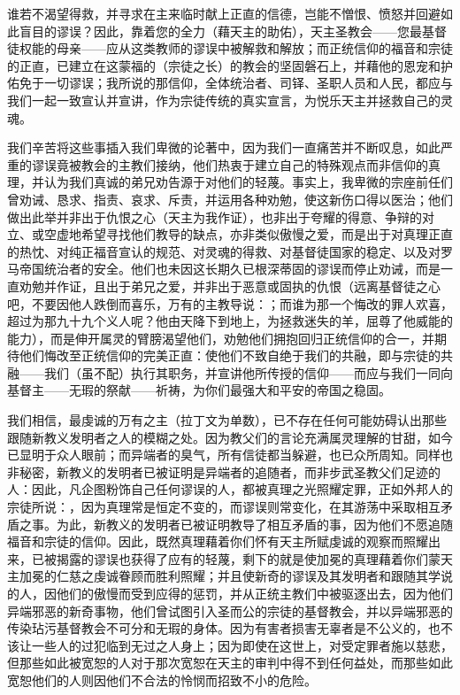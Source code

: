 谁若不渴望得救，并寻求在主来临时献上正直的信德，岂能不憎恨、愤怒并回避如此盲目的谬误？因此，靠着您的全力（藉天主的助佑），天主圣教会——您最基督徒权能的母亲——应从这类教师的谬误中被解救和解放；而正统信仰的福音和宗徒的正直，已建立在这蒙福的（宗徒之长）的教会的坚固磐石上，并藉他的恩宠和护佑免于一切谬误；我所说的那信仰，全体统治者、司铎、圣职人员和人民，都应与我们一起一致宣认并宣讲，作为宗徒传统的真实宣言，为悦乐天主并拯救自己的灵魂。\par

我们辛苦将这些事插入我们卑微的论著中，因为我们一直痛苦并不断叹息，如此严重的谬误竟被教会的主教们接纳，他们热衷于建立自己的特殊观点而非信仰的真理，并认为我们真诚的弟兄劝告源于对他们的轻蔑。事实上，我卑微的宗座前任们曾劝诫、恳求、指责、哀求、斥责，并运用各种劝勉，使这新伤口得以医治；他们做出此举并非出于仇恨之心（天主为我作证），也非出于夸耀的得意、争辩的对立、或空虚地希望寻找他们教导的缺点，亦非类似傲慢之爱，而是出于对真理正直的热忱、对纯正福音宣认的规范、对灵魂的得救、对基督徒国家的稳定、以及对罗马帝国统治者的安全。他们也未因这长期久已根深蒂固的谬误而停止劝诫，而是一直劝勉并作证，且出于弟兄之爱，并非出于恶意或固执的仇恨（远离基督徒之心吧，不要因他人跌倒而喜乐，万有的主教导说：；而谁为那一个悔改的罪人欢喜，超过为那九十九个义人呢？他由天降下到地上，为拯救迷失的羊，屈尊了他威能的能力），而是伸开属灵的臂膀渴望他们，劝勉他们拥抱回归正统信仰的合一，并期待他们悔改至正统信仰的完美正直：使他们不致自绝于我们的共融，即与宗徒的共融——我们（虽不配）执行其职务，并宣讲他所传授的信仰——而应与我们一同向基督主——无瑕的祭献——祈祷，为你们最强大和平安的帝国之稳固。\par

我们相信，最虔诚的万有之主（拉丁文为单数），已不存在任何可能妨碍认出那些跟随新教义发明者之人的模糊之处。因为教父们的言论充满属灵理解的甘甜，如今已显明于众人眼前；而异端者的臭气，所有信徒都当躲避，也已众所周知。同样也非秘密，新教义的发明者已被证明是异端者的追随者，而非步武圣教父们足迹的人：因此，凡企图粉饰自己任何谬误的人，都被真理之光照耀定罪，正如外邦人的宗徒所说：，因为真理常是恒定不变的，而谬误则常变化，在其游荡中采取相互矛盾之事。为此，新教义的发明者已被证明教导了相互矛盾的事，因为他们不愿追随福音和宗徒的信仰。因此，既然真理藉着你们怀有天主所赋虔诚的观察而照耀出来，已被揭露的谬误也获得了应有的轻蔑，剩下的就是使加冕的真理藉着你们蒙天主加冕的仁慈之虔诚眷顾而胜利照耀；并且使新奇的谬误及其发明者和跟随其学说的人，因他们的傲慢而受到应得的惩罚，并从正统主教们中被驱逐出去，因为他们异端邪恶的新奇事物，他们曾试图引入圣而公的宗徒的基督教会，并以异端邪恶的传染玷污基督教会不可分和无瑕的身体。因为有害者损害无辜者是不公义的，也不该让一些人的过犯临到无过之人身上；因为即使在这世上，对受定罪者施以慈悲，但那些如此被宽恕的人对于那次宽恕在天主的审判中得不到任何益处，而那些如此宽恕他们的人则因他们不合法的怜悯而招致不小的危险。\par

